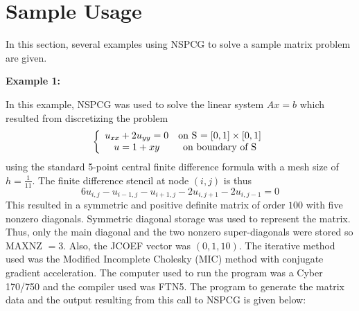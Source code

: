 \newpage
\section{Sample Usage}
\label{sample}
\indent 
  
   In this section, several examples using NSPCG to solve a sample
matrix problem are given.
\bigskip

\noindent
{\bf Example 1:}
\bigskip
\indent

In this example, NSPCG was used to solve the linear system $Ax=b$
which resulted from discretizing the problem
\[ \left\{ \begin{array}{cc}
 u_{xx} + 2u_{yy} = 0 & \mbox{on S $= [0,1]\times[0,1]$} \\
 u = 1 + xy           & \mbox{on boundary of S}
\end{array} \right. \]
using the standard 5-point central finite difference formula with 
a mesh size of $h = \frac{1}{11}$.  The finite difference stencil 
at node $(i,j)$ is thus
\[ 6u_{i,j}-u_{i-1,j}-u_{i+1,j}-2u_{i,j+1}-2u_{i,j-1} = 0 \]
This resulted in a symmetric and positive definite matrix of order 
$100$ with five nonzero diagonals.  Symmetric diagonal storage was 
used to represent the matrix.  Thus, only the main diagonal and the 
two nonzero super-diagonals were stored so MAXNZ $=3$. Also, the 
JCOEF vector was $(0,1,10)$.  The iterative method used was 
the Modified Incomplete Cholesky (MIC) method with conjugate gradient 
acceleration.  The computer used to run the program was a Cyber 170/750
and the compiler used was FTN5.  The program to generate the matrix 
data and the output resulting from this call to NSPCG is given below:

